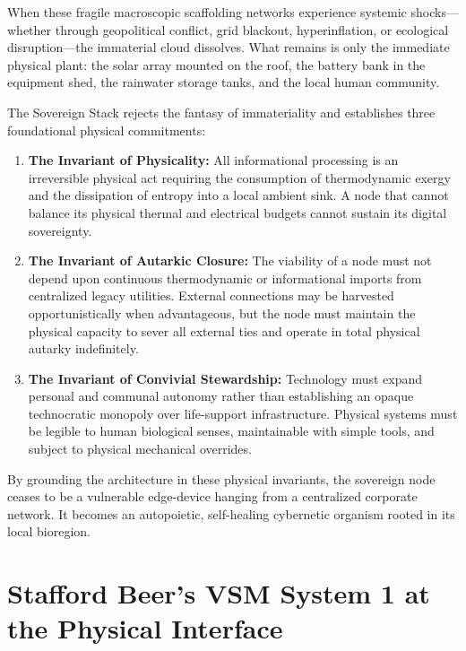 When these fragile macroscopic scaffolding networks experience systemic shocks---whether through geopolitical conflict, grid blackout, hyperinflation, or ecological disruption---the immaterial cloud dissolves. What remains is only the immediate physical plant: the solar array mounted on the roof, the battery bank in the equipment shed, the rainwater storage tanks, and the local human community.

The Sovereign Stack rejects the fantasy of immateriality and establishes three foundational physical commitments:
\begin{enumerate}
    \item \textbf{The Invariant of Physicality:} All informational processing is an irreversible physical act requiring the consumption of thermodynamic exergy and the dissipation of entropy into a local ambient sink. A node that cannot balance its physical thermal and electrical budgets cannot sustain its digital sovereignty.
    \item \textbf{The Invariant of Autarkic Closure:} The viability of a node must not depend upon continuous thermodynamic or informational imports from centralized legacy utilities. External connections may be harvested opportunistically when advantageous, but the node must maintain the physical capacity to sever all external ties and operate in total physical autarky indefinitely.
    \item \textbf{The Invariant of Convivial Stewardship:} Technology must expand personal and communal autonomy rather than establishing an opaque technocratic monopoly over life-support infrastructure. Physical systems must be legible to human biological senses, maintainable with simple tools, and subject to physical mechanical overrides.
\end{enumerate}

By grounding the architecture in these physical invariants, the sovereign node ceases to be a vulnerable edge-device hanging from a centralized corporate network. It becomes an autopoietic, self-healing cybernetic organism rooted in its local bioregion.

\section{Stafford Beer's VSM System 1 at the Physical Interface}
\label{sec:intro_vsm}

